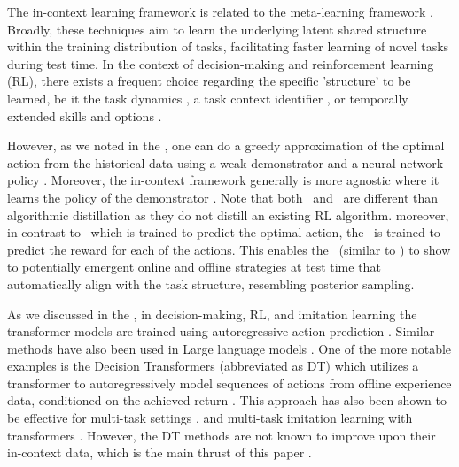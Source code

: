 The in-context learning framework is related to the meta-learning framework \citep{bengio1990learning, schaul2010metalearning}.  Broadly, these techniques aim to learn the underlying latent shared structure within the training distribution of tasks, facilitating faster learning of novel tasks during test time. In the context of decision-making and reinforcement learning (RL), there exists a frequent choice regarding the specific 'structure' to be learned, be it the task dynamics \citep{fu2016one, nagabandi2018learning, landolfi2019model}, a task context identifier \citep{rakelly2019efficient, zintgraf2019varibad, liu2021decoupling}, or temporally extended skills and options \citep{perkins1999using, gupta2018meta, jiang2022learning}.

However, as we noted in the , one can do a greedy approximation of the optimal action from the historical data using a weak demonstrator and a neural network policy \citep{finn2017model, rothfuss2018promp}. Moreover, the in-context framework generally is more agnostic where it learns the policy of the demonstrator \citep{duan2016rl, wang2016learning, mishra2017simple}. Note that both \dptg\ and \pred\ are different than algorithmic distillation \citep{laskin2022context, lu2023structured} as they do not distill an existing RL algorithm. moreover, in contrast to \dptg\ which is trained to predict the optimal action, the \pred\ is trained to predict the reward for each of the actions. This enables the \pred\ (similar to \dptg) to show to potentially emergent online and offline strategies at test time that automatically align with the task structure, resembling posterior sampling.


As we discussed in the , in decision-making, RL, and imitation learning the transformer models are trained using autoregressive action prediction \citep{yang2023bayesian}. Similar methods have also been used in Large language models \citep{vaswani2017attention, roberts2019exploring}. One of the more notable examples is the Decision Transformers (abbreviated as DT) which utilizes a transformer to autoregressively model sequences of actions from offline experience data, conditioned on the achieved return \citep{chen2021decision, janner2021offline}. This approach has also been shown to be effective for multi-task settings \citep{lee2022multi}, and multi-task imitation learning with transformers \citep{reed2022generalist, brohan2022rt, shafiullah2022behavior}. However, the DT methods are not known to improve upon their in-context data, which is the main thrust of this paper \citep{brandfonbrener2022does, yang2022dichotomy}.


